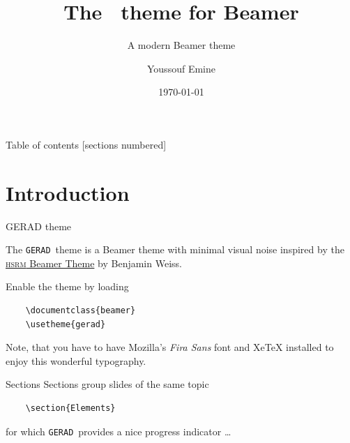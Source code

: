 \documentclass[10pt]{beamer}
\title{The \themename\ theme for Beamer}
\subtitle{A modern Beamer theme}
\date{\today}
\author{Youssouf Emine}
\institute{GERAD}
\newcommand{\themename}{\texttt{GERAD}\xspace}
\begin{document}
\maketitle

\begin{frame}{Table of contents}
  [sections numbered]
  \tableofcontents[hideallsubsections]
\end{frame}

\section{Introduction}

\begin{frame}[fragile]{GERAD theme}

  The \themename\ theme is a Beamer theme with minimal visual noise
  inspired by the \href{https://github.com/hsrmbeamertheme/hsrmbeamertheme}{\textsc{hsrm} Beamer
  Theme} by Benjamin Weiss.

  Enable the theme by loading

  \begin{verbatim}    \documentclass{beamer}
    \usetheme{gerad}\end{verbatim}

  Note, that you have to have Mozilla's \emph{Fira Sans} font and XeTeX
  installed to enjoy this wonderful typography.
\end{frame}
\begin{frame}[fragile]{Sections}
  Sections group slides of the same topic

  \begin{verbatim}    \section{Elements}\end{verbatim}

  for which \themename\ provides a nice progress indicator \ldots
\end{frame}
\end{document}
